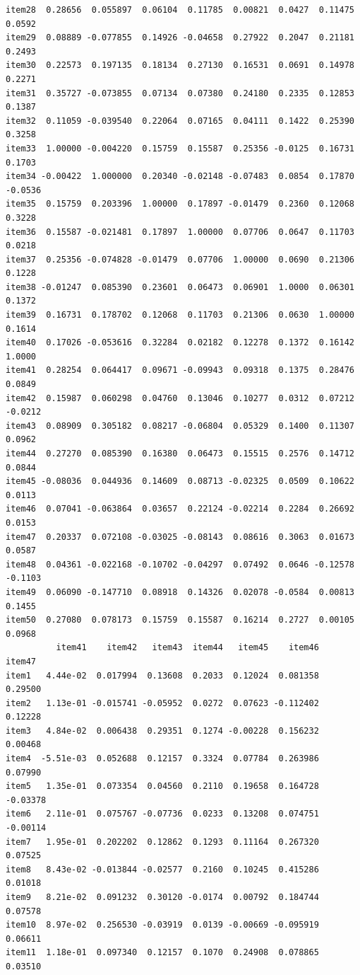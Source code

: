 \documentclass[
  a4paper,
]{ltjsbook}
\begin{document}
\begin{verbatim}
item28  0.28656  0.055897  0.06104  0.11785  0.00821  0.0427  0.11475  0.0592
item29  0.08889 -0.077855  0.14926 -0.04658  0.27922  0.2047  0.21181  0.2493
item30  0.22573  0.197135  0.18134  0.27130  0.16531  0.0691  0.14978  0.2271
item31  0.35727 -0.073855  0.07134  0.07380  0.24180  0.2335  0.12853  0.1387
item32  0.11059 -0.039540  0.22064  0.07165  0.04111  0.1422  0.25390  0.3258
item33  1.00000 -0.004220  0.15759  0.15587  0.25356 -0.0125  0.16731  0.1703
item34 -0.00422  1.000000  0.20340 -0.02148 -0.07483  0.0854  0.17870 -0.0536
item35  0.15759  0.203396  1.00000  0.17897 -0.01479  0.2360  0.12068  0.3228
item36  0.15587 -0.021481  0.17897  1.00000  0.07706  0.0647  0.11703  0.0218
item37  0.25356 -0.074828 -0.01479  0.07706  1.00000  0.0690  0.21306  0.1228
item38 -0.01247  0.085390  0.23601  0.06473  0.06901  1.0000  0.06301  0.1372
item39  0.16731  0.178702  0.12068  0.11703  0.21306  0.0630  1.00000  0.1614
item40  0.17026 -0.053616  0.32284  0.02182  0.12278  0.1372  0.16142  1.0000
item41  0.28254  0.064417  0.09671 -0.09943  0.09318  0.1375  0.28476  0.0849
item42  0.15987  0.060298  0.04760  0.13046  0.10277  0.0312  0.07212 -0.0212
item43  0.08909  0.305182  0.08217 -0.06804  0.05329  0.1400  0.11307  0.0962
item44  0.27270  0.085390  0.16380  0.06473  0.15515  0.2576  0.14712  0.0844
item45 -0.08036  0.044936  0.14609  0.08713 -0.02325  0.0509  0.10622  0.0113
item46  0.07041 -0.063864  0.03657  0.22124 -0.02214  0.2284  0.26692  0.0153
item47  0.20337  0.072108 -0.03025 -0.08143  0.08616  0.3063  0.01673  0.0587
item48  0.04361 -0.022168 -0.10702 -0.04297  0.07492  0.0646 -0.12578 -0.1103
item49  0.06090 -0.147710  0.08918  0.14326  0.02078 -0.0584  0.00813  0.1455
item50  0.27080  0.078173  0.15759  0.15587  0.16214  0.2727  0.00105  0.0968
          item41    item42   item43  item44   item45    item46   item47
item1   4.44e-02  0.017994  0.13608  0.2033  0.12024  0.081358  0.29500
item2   1.13e-01 -0.015741 -0.05952  0.0272  0.07623 -0.112402  0.12228
item3   4.84e-02  0.006438  0.29351  0.1274 -0.00228  0.156232  0.00468
item4  -5.51e-03  0.052688  0.12157  0.3324  0.07784  0.263986  0.07990
item5   1.35e-01  0.073354  0.04560  0.2110  0.19658  0.164728 -0.03378
item6   2.11e-01  0.075767 -0.07736  0.0233  0.13208  0.074751 -0.00114
item7   1.95e-01  0.202202  0.12862  0.1293  0.11164  0.267320  0.07525
item8   8.43e-02 -0.013844 -0.02577  0.2160  0.10245  0.415286  0.01018
item9   8.21e-02  0.091232  0.30120 -0.0174  0.00792  0.184744  0.07578
item10  8.97e-02  0.256530 -0.03919  0.0139 -0.00669 -0.095919  0.06611
item11  1.18e-01  0.097340  0.12157  0.1070  0.24908  0.078865  0.03510

\end{verbatim}
\end{document}

